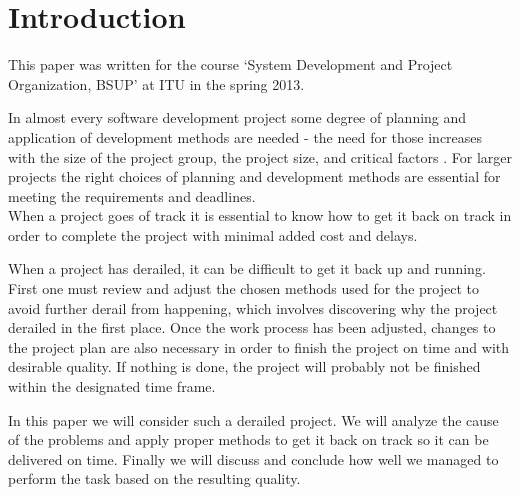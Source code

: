 \section{Introduction}
This paper was written for the course `System Development and Project Organization, BSUP' at ITU in the spring 2013.

In almost every software development project some degree of planning and application of development methods are needed - the need for those increases with the size of the project group, the project size, and critical factors \cite[p. 134]{ac}. For larger projects the right choices of planning and development methods are essential for meeting the requirements and deadlines.\\
When a project goes of track it is essential to know how to get it back on track in order to complete the project with minimal added cost and delays. %

When a project has derailed, it can be difficult to get it back up and running. First one must review and adjust the chosen methods used for the project to avoid further derail from happening, which involves discovering why the project derailed in the first place.
Once the work process has been adjusted, changes to the project plan are also necessary in order to finish the project on time and with desirable quality. If nothing is done, the project will probably not be finished within the designated time frame.

In this paper we will consider such a derailed project. We will analyze the cause of the problems and apply proper methods to get it back on track so it can be delivered on time.
Finally we will discuss and conclude how well we managed to perform the task based on the resulting quality.
\newpage